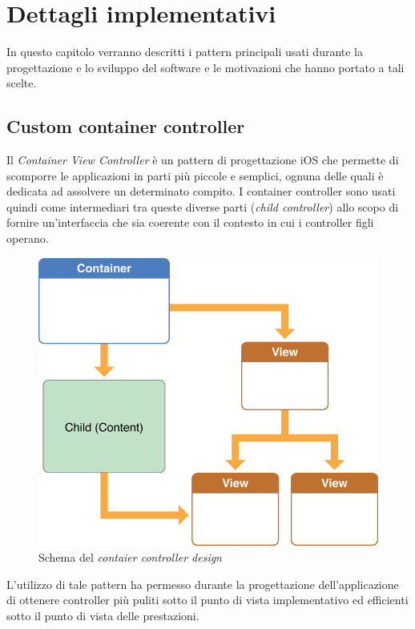 \chapter{Dettagli implementativi}

In questo capitolo verranno descritti i pattern principali usati durante la progettazione e lo sviluppo del software e le motivazioni che hanno portato a tali scelte.

\section{Custom container controller}
Il \emph{Container View Controller} è un pattern di progettazione iOS che permette di scomporre le applicazioni in parti più piccole e semplici, ognuna delle quali è dedicata ad assolvere un determinato compito. I container controller sono usati quindi come intermediari tra queste diverse parti (\emph{child controller}) allo scopo di fornire un'interfaccia che sia coerente con il contesto in cui i controller figli operano.

\begin{figure}[!htbp]
\centering
\includegraphics[scale=0.30]{architettura/container.png}
\caption{Schema del \emph{contaier controller design}}
\label{fig:selettore}
\end{figure}

L'utilizzo di tale pattern ha permesso durante la progettazione dell'applicazione di ottenere controller più puliti sotto il punto di vista implementativo ed efficienti sotto il punto di vista delle prestazioni.

